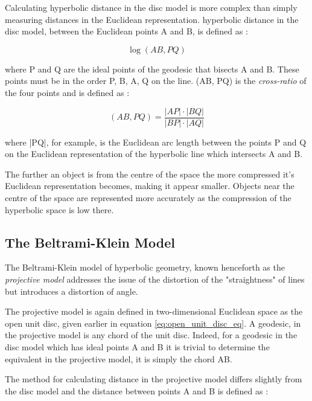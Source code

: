 Calculating hyperbolic distance in the disc model is more complex than simply measuring distances in the Euclidean representation. hyperbolic distance in the disc model, between the Euclidean points A and B, is defined as \cite{blair_inversion_2000}:

\begin{equation}
\label{distance_disc_model}
\log(AB,PQ)
\end{equation}

where P and Q are the ideal points of the geodesic that bisects A and B. These points must be in the order P, B, A, Q on the line. (AB, PQ) is the \textit{cross-ratio} of the four points and is defined as \cite{blair_inversion_2000}:

\begin{equation}
\label{cross_ratio}
(AB,PQ) = \frac{|AP|\cdot|BQ|}{|BP|\cdot|AQ|}
\end{equation}

where |PQ|, for example, is the Euclidean arc length between the points P and Q on the Euclidean representation of the hyperbolic line which intersects A and B.

The further an object is from the centre of the space the more compressed it's Euclidean representation becomes, making it appear smaller. Objects near the centre of the space are represented more accurately as the compression of the hyperbolic space is low there.

\subsection{The Beltrami-Klein Model}

The Beltrami-Klein model of hyperbolic geometry, known henceforth as the \textit{projective model} addresses the issue of the distortion of the "straightness" of lines but introduces a distortion of angle.

The projective model is again defined in two-dimensional Euclidean space as the open unit disc, given earlier in equation \ref{eq:open_unit_disc_eq}. A geodesic, in the projective model is any chord of the unit disc. Indeed, for a geodesic in the disc model which has ideal points A and B it is trivial to determine the equivalent in the projective model, it is simply the chord AB.

The method for calculating distance in the projective model differs slightly from the disc model and the distance between points A and B is defined as \cite{milnor_hyperbolic_1982}:

